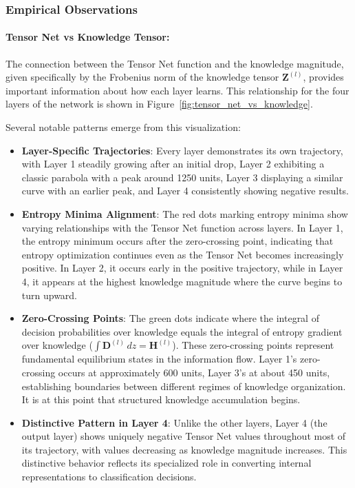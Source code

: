 \documentclass{article}
\begin{document}
	
\subsubsection{Empirical Observations}
\paragraph{Tensor Net vs Knowledge Tensor:}
The connection between the Tensor Net function and the knowledge magnitude, given specifically by the Frobenius norm of the knowledge tensor \(\mathbf{Z}^{(l)}\), provides important information about how each layer learns. This relationship for the four layers of the network is shown in Figure~\ref{fig:tensor_net_vs_knowledge}.

	
	Several notable patterns emerge from this visualization:
	
	\begin{itemize}
		\item \textbf{Layer-Specific Trajectories}: Every layer demonstrates its own trajectory, with Layer 1 steadily growing after an initial drop, Layer 2 exhibiting a classic parabola with a peak around 1250 units, Layer 3 displaying a similar curve with an earlier peak, and Layer 4 consistently showing negative results.

		
		\item \textbf{Entropy Minima Alignment}: The red dots marking entropy minima show varying relationships with the Tensor Net function across layers. In Layer 1, the entropy minimum occurs after the zero-crossing point, indicating that entropy optimization continues even as the Tensor Net becomes increasingly positive. In Layer 2, it occurs early in the positive trajectory, while in Layer 4, it appears at the highest knowledge magnitude where the curve begins to turn upward.
		
		\item \textbf{Zero-Crossing Points}: The green dots indicate where the integral of decision probabilities over knowledge equals the integral of entropy gradient over knowledge ($\int \mathbf{D}^{(l)} \, dz = \mathbf{H}^{(l)}$). These zero-crossing points represent fundamental equilibrium states in the information flow. Layer 1's zero-crossing occurs at approximately 600 units, Layer 3's at about 450 units, establishing boundaries between different regimes of knowledge organization. It is at this point that structured knowledge accumulation begins.
		
		\item \textbf{Distinctive Pattern in Layer 4}: Unlike the other layers, Layer 4 (the output layer) shows uniquely negative Tensor Net values throughout most of its trajectory, with values decreasing as knowledge magnitude increases. This distinctive behavior reflects its specialized role in converting internal representations to classification decisions.
	\end{itemize}
\end{document}
